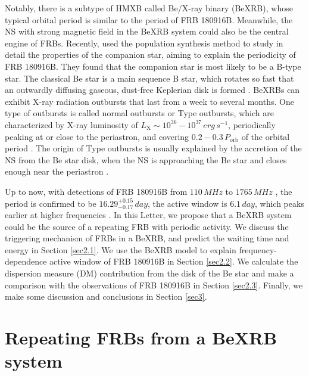 \documentclass[twocolumn]{aastex62}
\newcommand{\frb}{FRB 180916B}
\begin{document}
Notably, there is a subtype of HMXB called Be/X-ray binary (BeXRB), whose typical orbital period \citep[$\sim 10$\,day to 1\,yr;][]{oka02} is similar to the period of \frb. 
Meanwhile, the NS with strong magnetic field \citep[$\sim 10^{12}-10^{13}$\,G;][]{tau06} in the 
BeXRB system could also be the central engine of FRBs.
Recently, \cite{zhanggao20} used the population synthesis method to study in detail the properties of the companion star, aiming to explain the periodicity of FRB 180916B. They found that the companion star is most likely to be a B-type star.
The classical Be star is a main sequence B star, which rotates so fast that an outwardly diffusing gaseous, dust-free Keplerian disk is formed \citep{oka01}.
BeXRBs can exhibit X-ray radiation outbursts that last from a week to several months. One type of outbursts is called normal outbursts or Type \uppercase\expandafter{} outbursts, which are characterized by X-ray luminosity of $L_{\text{X}} \sim 10^{36}-10^{37} \,\unit{erg\, s^{-1}}$, periodically peaking at or close to the periastron, and covering $0.2-0.3\,P_{\text{orb}}$ of the orbital period \citep[e.g.,][]{rei11}.
The origin of Type \uppercase\expandafter{} outbursts is usually explained by the accretion of the NS from the Be star disk, when the NS is approaching the Be star and closes enough near the periastron \citep[e.g.,][]{oka01}.

Up to now, with detections of FRB 180916B from $110\,\unit{MHz}$ to $1765\,\unit{MHz}$ \citep{pas20, san20, Chime/Frb2020, mart20, agg20}, the period is confirmed to be $16.29_{-0.17}^{+0.15}\,\unit{day}$, the active window is $6.1\,\unit{day}$, which peaks earlier at higher frequencies \citep{pas20}.
In this Letter, we propose that a BeXRB system could be the source of a repeating FRB with periodic activity.
We discuss the triggering mechanism of FRBs in a BeXRB, and predict the waiting time and energy in Section \ref{sec2.1}.
We use the BeXRB model to explain frequency-dependence active window of FRB 180916B in Section \ref{sec2.2}.
We calculate the dispersion measure (DM) contribution from the disk of the Be star and make a comparison with the observations of FRB 180916B in Section \ref{sec2.3}.
Finally,  we make some discussion and conclusions in Section \ref{sec3}.


\section{Repeating FRBs from a BeXRB system}\label{sec2}
\end{document}
